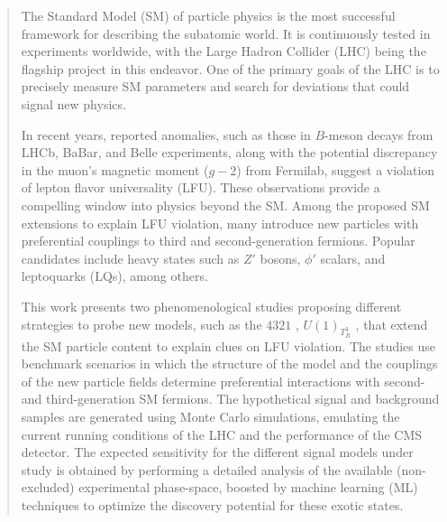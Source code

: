 \documentclass[11pt, letterpaper]{book}%
\begin{document}
\begin{abstract}
The Standard Model (SM) of particle physics is the most successful framework for describing the subatomic world. It is continuously tested in experiments worldwide, with the Large Hadron Collider (LHC) being the flagship project in this endeavor. One of the primary goals of the LHC is to precisely measure SM parameters and search for deviations that could signal new physics.  

In recent years, reported anomalies, such as those in $B$-meson decays from LHCb, BaBar, and Belle experiments, along with the potential discrepancy in the muon's magnetic moment ($g-2$) from Fermilab, suggest a violation of lepton flavor universality (LFU). These observations provide a compelling window into physics beyond the SM. Among the proposed SM extensions to explain LFU violation, many introduce new particles with preferential couplings to third and second-generation fermions. Popular candidates include heavy states such as $Z'$ bosons, $\phi'$ scalars, and leptoquarks (LQs), among others.

This work presents two phenomenological studies proposing different strategies to probe new models, such as the $4321$ \cite{Florez2023}, $U(1)_{T^3_R}$ \cite{Qureshi:2024naw}, that extend the SM particle content to explain clues on LFU violation. The studies use benchmark scenarios in which the structure of the model and the couplings of the new particle fields determine preferential interactions with second- and third-generation SM fermions. The hypothetical signal and background samples are generated using Monte Carlo simulations, emulating the current running conditions of the LHC and the performance of the CMS detector. The expected sensitivity for the different signal models under study is obtained by performing a detailed analysis of the available (non-excluded) experimental phase-space, boosted by  machine learning (ML) techniques to optimize the discovery potential for these exotic states.
\end{abstract}

\tableofcontents

\mainmatter

% 

\appendix
% 
% 
% 
% 

% 

% 
\backmatter

\renewcommand{\theequation}{{\Alph{chapter}.\arabic{equation}}}
\renewcommand{\thefigure}{{\Alph{chapter}.\arabic{figure}}}
\renewcommand{\thetable}{{\Alph{chapter}.\arabic{table}}}
{}
\printbibliography

% 
\end{document}
